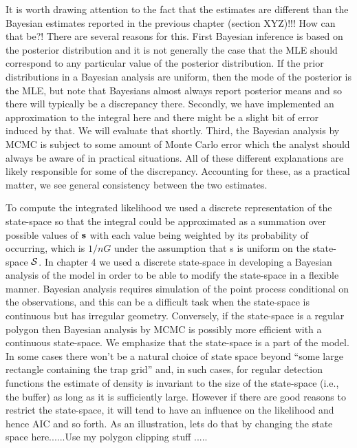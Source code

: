 It is worth drawing attention to the fact that the estimates are
different than the Bayesian estimates reported in the previous chapter
(section XYZ)!!! How can that be?!  There are several reasons for
this.  First Bayesian inference is based on the posterior distribution
and it is not generally the case that the MLE should correspond to any
particular value of the posterior distribution. If the prior
distributions in a Bayesian analysis are uniform, then the mode of the
posterior is the MLE, but note that Bayesians almost always report
posterior means and so there will typically be a discrepancy
there. Secondly, we have implemented an approximation to the integral
here and there might be a slight bit of error induced by that. We will
evaluate that shortly. Third, the Bayesian analysis by MCMC is subject
to some amount of Monte Carlo error which the analyst should always be
aware of in practical situations.  All of these different explanations
are likely responsible for some of the discrepancy. Accounting for
these, as a practical matter, we see general consistency between the
two estimates.

To compute the integrated likelihood we used a discrete representation
of the state-space so that the integral could be approximated as a
summation over possible values of ${\bf s}$ with each value being
weighted by its probability of occurring, which is $1/nG$ under the
assumption that s is uniform on the state-space ${\cal S}$. In chapter 4 we
used a discrete state-space in developing a Bayesian analysis of the
model in order to be able to modify the state-space in a flexible
manner. Bayesian analysis requires simulation of the point process
conditional on the observations, and this can be a difficult task when
the state-space is continuous but has irregular geometry.  Conversely,
if the state-space is a regular polygon then Bayesian analysis by MCMC
is possibly more efficient with a continuous state-space. We emphasize
that the state-space is a part of the model. In some cases there won’t
be a natural choice of state space beyond ``some large rectangle
containing the trap grid'' and, in such cases, for regular detection
functions the estimate of density is invariant to the size of the
state-space (i.e., the buffer) as long as it is sufficiently
large. However if there are good reasons to restrict the state-space,
it will tend to have an influence on the likelihood and hence AIC and
so forth.  As an illustration, lets do that by changing the state
space here......Use my polygon clipping stuff ..... 

